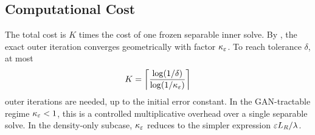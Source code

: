 \subsection{Computational Cost}

The total cost is $K$ times the cost of one frozen separable inner solve.
By , the exact outer iteration converges geometrically with
factor $\kappa_\varepsilon$. To reach tolerance $\delta$, at most
\[
  K = \left\lceil \frac{\log(1/\delta)}{\log(1/\kappa_\varepsilon)} \right\rceil
\]
outer iterations are needed, up to the initial error constant. In the
GAN-tractable regime $\kappa_\varepsilon < 1$, this is a controlled multiplicative
overhead over a single separable solve. In the density-only subcase,
$\kappa_\varepsilon$ reduces to the simpler expression $\varepsilon L_R/\lambda$.
